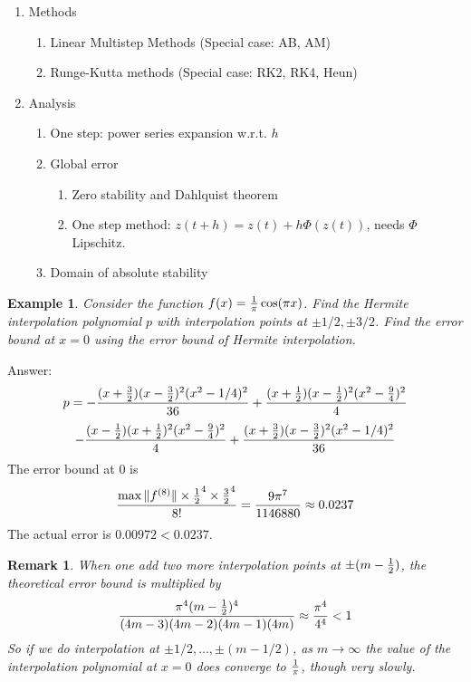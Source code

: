 \documentclass{article} %
\theoremstyle{break}
\newtheorem{exa}[definition]{Example}
\newtheorem{rem}[definition]{Remark}
\begin{document}
\begin{enumerate}
   \begin{enumerate}
   \item Methods
     \begin{enumerate}
     \item Linear Multistep Methods (Special case: AB, AM)
     \item Runge-Kutta methods (Special case: RK2, RK4, Heun)
      \end{enumerate}
    \item Analysis
      \begin{enumerate}
        \item One step: power series expansion w.r.t. $h$
        \item Global error
          \begin{enumerate}
          \item Zero stability and Dahlquist theorem
          \item One step method: $z(t+h)=z(t)+h\Phi(z(t))$, needs $\Phi$ Lipschitz.
          \end{enumerate}
        \item Domain of absolute stability
       \end{enumerate}
   \end{enumerate}

\end{enumerate}

\begin{exa}Consider the function $f(x)={1\over \pi}\cos(\pi x)$. Find the Hermite interpolation polynomial $p$ with interpolation points at $\pm1/2, \pm 3/2$. Find the error bound at $x=0$ using the error bound of Hermite interpolation.\end{exa}

Answer:
\[p=-{(x+{3\over 2})(x-{3\over 2})^2(x^2-1/4)^2\over 36}+{(x+{1\over 2})(x-{1\over 2})^2(x^2-{9\over 4})^2\over 4}\]
\[-{(x-{1\over 2})(x+{1\over 2})^2(x^2-{9\over 4})^2\over 4}+{(x+{3\over 2})(x-{3\over 2})^2(x^2-1/4)^2\over 36}\]
The error bound at $0$ is
\[{\max\|f^{(8)}\|\times {1\over 2}^4\times {3\over 2}^4\over 8!}={9\pi^7\over 1146880}\approx 0.0237\]
The actual error is $0.00972<0.0237$.\\

\begin{rem}When one add two more interpolation points at $\pm (m-{1\over 2})$, the theoretical error bound is multiplied by
  \[{\pi^4(m-{1\over 2})^4\over (4m-3)(4m-2)(4m-1)(4m)}\approx {\pi^4\over 4^4}<1\]
  So if we do interpolation at $\pm 1/2, \dots, \pm (m-1/2)$, as $m\rightarrow \infty$ the value of the interpolation polynomial at $x=0$ does converge to $1\over \pi$, though very slowly.
\end{rem}
\end{document}
